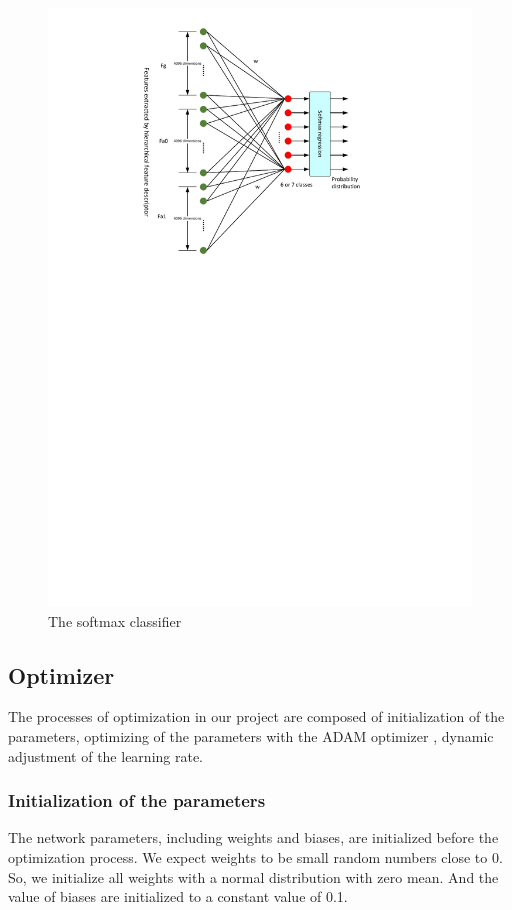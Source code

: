 \begin{figure}
	\includegraphics[trim=2cm 17cm 0cm 1cm]{fig01/softmax.pdf}
	\caption{The softmax classifier}
	\label{fig:softmax}
\end{figure}

\subsection{Optimizer}
The processes of optimization in our project are composed of initialization of the parameters, optimizing of the parameters  with the ADAM optimizer  \cite{adam}, dynamic adjustment of the learning rate. 
\subsubsection*{Initialization of the parameters}
\label{Initialization}
The network parameters, including weights and biases, are initialized before the optimization process. We expect weights to be small random numbers close to \(0\). So, we initialize all weights with a normal distribution with zero mean. And the value of biases are initialized to a constant value of 0.1.  
